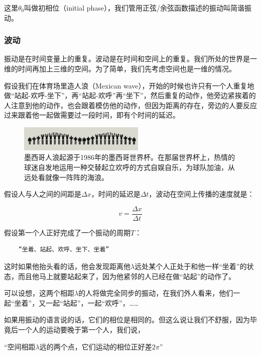 这里$\theta_0$叫做初相位（initial phase），我们管用正弦/余弦函数描述的振动叫简谐振动。

\subsubsection{波动}

振动是在时间变量上的重复。波动是在时间和空间上的重复。我们所处的世界是一维的时间再加上三维的空间。为了简单，我们先考虑空间也是一维的情况。

假设我们在体育场里造人浪（Mexican wave），开始的时候也许只有一个人重复地做“站起-欢呼-坐下”，再“站起-欢呼”再“坐下”，然后重复的动作，他旁边紧挨着的人注意到他的动作，也会跟着模仿他的动作，但因为距离的存在，旁边的人要反应过来跟着他一起做需要过一段时间，即有个时间的延迟。

\begin{figure}[htbp]
\begin{center}
\includegraphics[width=6cm]{Preface/mexicanwave.png}
\caption{墨西哥人浪起源于1986年的墨西哥世界杯。在那届世界杯上，热情的球迷自发地运用一种交替起立欢呼的方式自娱自乐，为球队加油，从远处看就像一阵阵的海浪。}
\end{center}
\end{figure}


假设人与人之间的间距是$\Delta x$，时间的延迟是$\Delta t$，波动在空间上传播的速度就是：

\begin{equation}
v = \frac{\Delta x }{\Delta t}
\end{equation}

假设第一个人正好完成了一个振动的周期$T$：

\begin{verbatim}
    “坐着、站起、欢呼、坐下、坐着”
\end{verbatim}

这时如果他抬头看的话，他会发现距离他$\lambda$远处某个人正处于和他一样“坐着”的状态，而且他马上就要站起来了，因为他紧邻的人已经在做“站起”的动作了。

可以设想，这两个相距$\lambda$的人将做完全同步的振动，在我们外人看来，他们一起“坐着”，又一起“站起”，一起“欢呼”，……

如果用振动的语言说的话，它们的相位是相同的。但这么说让我们不舒服，因为毕竟后一个人的运动要晚于第一个人，我们说，

\begin{center}
“空间相距$\lambda$远的两个点，它们运动的相位正好差$2 \pi$”
\end{center}

